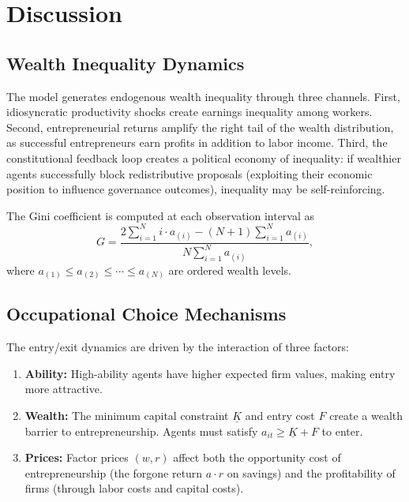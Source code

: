 \documentclass[12pt]{article}
\begin{document}
\section{Discussion}\label{sec:discussion}

\subsection{Wealth Inequality Dynamics}

The model generates endogenous wealth inequality through three channels. First, idiosyncratic productivity shocks create earnings inequality among workers. Second, entrepreneurial returns amplify the right tail of the wealth distribution, as successful entrepreneurs earn profits in addition to labor income. Third, the constitutional feedback loop creates a political economy of inequality: if wealthier agents successfully block redistributive proposals (exploiting their economic position to influence governance outcomes), inequality may be self-reinforcing.

The Gini coefficient is computed at each observation interval as
\begin{equation}\label{eq:gini}
  G = \frac{2 \sum_{i=1}^{N} i \cdot a_{(i)} - (N+1) \sum_{i=1}^{N} a_{(i)}}{N \sum_{i=1}^{N} a_{(i)}},
\end{equation}
where $a_{(1)} \leq a_{(2)} \leq \cdots \leq a_{(N)}$ are ordered wealth levels.


\subsection{Occupational Choice Mechanisms}

The entry/exit dynamics are driven by the interaction of three factors:
\begin{enumerate}
  \item \textbf{Ability:} High-ability agents have higher expected firm values, making entry more attractive.
  \item \textbf{Wealth:} The minimum capital constraint $\underline{K}$ and entry cost $F$ create a wealth barrier to entrepreneurship. Agents must satisfy $a_{it} \geq \underline{K} + F$ to enter.
  \item \textbf{Prices:} Factor prices $(w, r)$ affect both the opportunity cost of entrepreneurship (the forgone return $a \cdot r$ on savings) and the profitability of firms (through labor costs and capital costs).
\end{enumerate}
\end{document}
